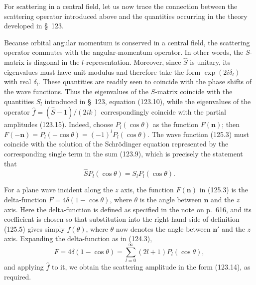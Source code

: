 For scattering in a central field, let us now trace the connection between the scattering operator introduced above and the quantities occurring in the theory developed in §~123.

Because orbital angular momentum is conserved in a central field, the scattering operator commutes with the angular-momentum operator. In other words, the $S$-matrix is diagonal in the $l$-representation. Moreover, since $\hat S$ is unitary, its eigenvalues must have unit modulus and therefore take the form $\exp(2i\delta_l)$ with real $\delta_l$. These quantities are readily seen to coincide with the phase shifts of the wave functions. Thus the eigenvalues of the $S$-matrix coincide with the quantities $S_l$ introduced in §~123, equation (123.10), while the eigenvalues of the operator $\hat f=(\hat S-1)/(2ik)$ correspondingly coincide with the partial amplitudes (123.15). Indeed, choose $P_l(\cos\theta)$ as the function $F(\mathbf n)$; then $F(-\mathbf n)=P_l(-\cos\theta)=(-1)^lP_l(\cos\theta)$. The wave function (125.3) must coincide with the solution of the Schrödinger equation represented by the corresponding single term in the sum (123.9), which is precisely the statement that
\[
 \hat SP_l(\cos\theta)=S_lP_l(\cos\theta).
\]

For a plane wave incident along the $z$ axis, the function $F(\mathbf n)$ in (125.3) is the delta-function $F=4\delta(1-\cos\theta)$, where $\theta$ is the angle between $\mathbf n$ and the $z$ axis. Here the delta-function is defined as specified in the note on p.~616, and its coefficient is chosen so that substitution into the right-hand side of definition (125.5) gives simply $f(\theta)$, where $\theta$ now denotes the angle between $\mathbf n'$ and the $z$ axis. Expanding the delta-function as in (124.3),
\begin{equation}
 F=4\delta(1-\cos\theta)=\sum_{l=0}^{\infty}(2l+1)P_l(\cos\theta),
 \tag{125.17}
\end{equation}
and applying $\hat f$ to it, we obtain the scattering amplitude in the form (123.14), as required.

